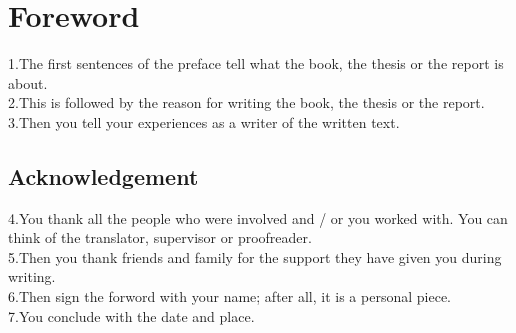 \chapter*{Foreword}
\thispagestyle{plain}


1.The first sentences of the preface tell what the book, the thesis or the report is about.\\
2.This is followed by the reason for writing the book, the thesis or the report.\\
3.Then you tell your experiences as a writer of the written text.\\



\section*{Acknowledgement} 

4.You thank all the people who were involved and / or you worked with. You can think of the translator, supervisor or proofreader.\\
5.Then you thank friends and family for the support they have given you during writing.\\
6.Then sign the forword with your name; after all, it is a personal piece.\\
7.You conclude with the date and place.
